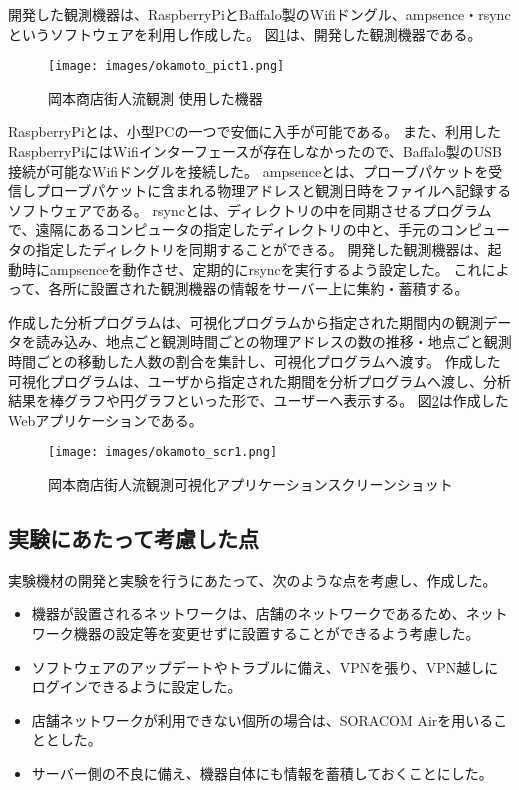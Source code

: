 開発した観測機器は、RaspberryPiとBaffalo製のWifiドングル、ampsence・rsyncというソフトウェアを利用し作成した。
図\ref{fig:okamoto_pict1}は、開発した観測機器である。
\begin{figure}[htbp]
\texttt{[image: images/okamoto\_pict1.png]}
\caption{岡本商店街人流観測 使用した機器}
\label{fig:okamoto_pict1}
\end{figure}
RaspberryPiとは、小型PCの一つで安価に入手が可能である。
また、利用したRaspberryPiにはWifiインターフェースが存在しなかったので、Baffalo製のUSB接続が可能なWifiドングルを接続した。
ampsenceとは、プローブパケットを受信しプローブパケットに含まれる物理アドレスと観測日時をファイルへ記録するソフトウェアである。
rsyncとは、ディレクトリの中を同期させるプログラムで、遠隔にあるコンピュータの指定したディレクトリの中と、手元のコンピュータの指定したディレクトリを同期することができる。
開発した観測機器は、起動時にampsenceを動作させ、定期的にrsyncを実行するよう設定した。
これによって、各所に設置された観測機器の情報をサーバー上に集約・蓄積する。

作成した分析プログラムは、可視化プログラムから指定された期間内の観測データを読み込み、地点ごと観測時間ごとの物理アドレスの数の推移・地点ごと観測時間ごとの移動した人数の割合を集計し、可視化プログラムへ渡す。
作成した可視化プログラムは、ユーザから指定された期間を分析プログラムへ渡し、分析結果を棒グラフや円グラフといった形で、ユーザーへ表示する。
図\ref{fig:okamoto_ss}は作成したWebアプリケーションである。
\begin{figure}[htbp]
\texttt{[image: images/okamoto\_scr1.png]}
\caption{岡本商店街人流観測可視化アプリケーションスクリーンショット}
\label{fig:okamoto_ss}
\end{figure}

\subsection{実験にあたって考慮した点}
実験機材の開発と実験を行うにあたって、次のような点を考慮し、作成した。
\begin{itemize}
\item 機器が設置されるネットワークは、店舗のネットワークであるため、ネットワーク機器の設定等を変更せずに設置することができるよう考慮した。
\item ソフトウェアのアップデートやトラブルに備え、VPNを張り、VPN越しにログインできるように設定した。
\item 店舗ネットワークが利用できない個所の場合は、SORACOM Airを用いることとした。
\item サーバー側の不良に備え、機器自体にも情報を蓄積しておくことにした。
\end{itemize}

